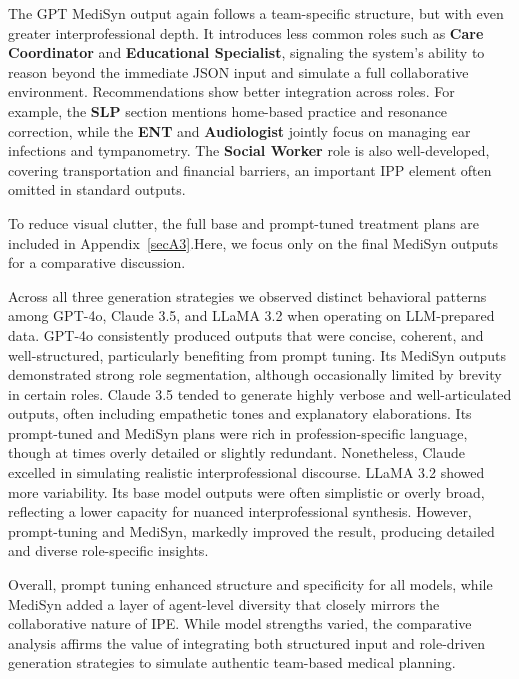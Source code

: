 \documentclass[pdflatex,sn-mathphys-num]{sn-jnl}%
\theoremstyle{thmstyleone}%
\theoremstyle{thmstyletwo}%
\theoremstyle{thmstylethree}%
\begin{document}
The GPT MediSyn output again follows a team-specific structure, but with even greater interprofessional depth. It introduces less common roles such as \textbf{Care Coordinator} and \textbf{Educational Specialist}, signaling the system's ability to reason beyond the immediate JSON input and simulate a full collaborative environment. Recommendations show better integration across roles. For example, the \textbf{SLP} section mentions home-based practice and resonance correction, while the \textbf{ENT} and \textbf{Audiologist} jointly focus on managing ear infections and tympanometry. The \textbf{Social Worker} role is also well-developed, covering transportation and financial barriers, an important IPP element often omitted in standard outputs. 

\vspace{1ex}
\noindent
To reduce visual clutter, the full base and prompt-tuned treatment plans are included in Appendix~\ref{secA3}.Here, we focus only on the final MediSyn outputs for a comparative discussion.
\vspace{1ex}

Across all three generation strategies we observed distinct behavioral patterns among GPT-4o, Claude 3.5, and LLaMA 3.2 when operating on LLM-prepared data. GPT-4o consistently produced outputs that were concise, coherent, and well-structured, particularly benefiting from prompt tuning. Its MediSyn outputs demonstrated strong role segmentation, although occasionally limited by brevity in certain roles. Claude 3.5 tended to generate highly verbose and well-articulated outputs, often including empathetic tones and explanatory elaborations. Its prompt-tuned and MediSyn plans were rich in profession-specific language, though at times overly detailed or slightly redundant. Nonetheless, Claude excelled in simulating realistic interprofessional discourse. LLaMA 3.2 showed more variability. Its base model outputs were often simplistic or overly broad, reflecting a lower capacity for nuanced interprofessional synthesis. However, prompt-tuning and MediSyn, markedly improved the result, producing detailed and diverse role-specific insights.

Overall, prompt tuning enhanced structure and specificity for all models, while MediSyn added a layer of agent-level diversity that closely mirrors the collaborative nature of IPE. While model strengths varied, the comparative analysis affirms the value of integrating both structured input and role-driven generation strategies to simulate authentic team-based medical planning.
\end{document}
